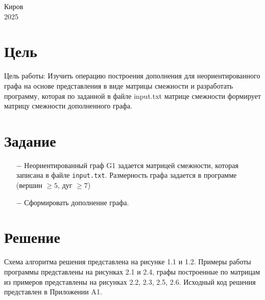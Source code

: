 \documentclass[oneside,a4paper,14pt]{extarticle}
\begin{document}
\begin{center}
	Киров\\
	2025
\end{center}

\newpage\thispagestyle{plain}

\section*{Цель}

Цель работы: Изучить операцию построения дополнения для неориентированного графа на основе представления в виде матрицы смежности и разработать программу, которая по заданной в файле input.txt матрице смежности формирует матрицу смежности дополненного графа.

\section*{Задание}
\begin{itemize}
	\item[$-$] Неориентированный граф G1 задается матрицей смежности, которая записана в файле \texttt{input.txt}. Размерность графа задается в программе (вершин $\geq 5$, дуг $\geq 7$)
	\item[$-$] Сформировать дополнение графа.
\end{itemize}
\section*{Решение}

Схема алгоритма решения представлена на рисунке 1.1 и 1.2. Примеры работы программы представлены на рисунках 2.1 и 2.4, графы построенные по матрицам из примеров представлены на рисунках 2.2, 2.3, 2.5, 2.6. Исходный код решения представлен в Приложении A1.
\end{document}
